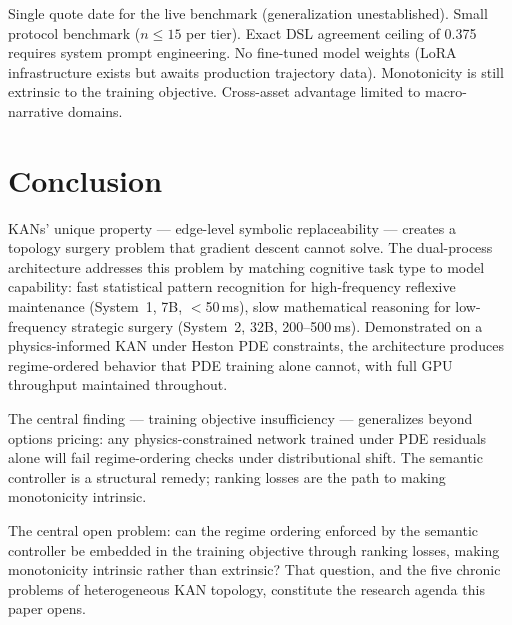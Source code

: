 \documentclass[11pt,a4paper]{article}
\begin{document}
Single quote date for the live benchmark (generalization unestablished). Small protocol
benchmark ($n \leq 15$ per tier). Exact DSL agreement ceiling of 0.375 requires system
prompt engineering. No fine-tuned model weights (LoRA infrastructure exists but
awaits production trajectory data). Monotonicity is still extrinsic to the training
objective. Cross-asset advantage limited to macro-narrative domains.

\section{Conclusion}
\label{sec:conclusion}

KANs' unique property --- edge-level symbolic replaceability --- creates a topology
surgery problem that gradient descent cannot solve. The dual-process architecture
addresses this problem by matching cognitive task type to model capability: fast
statistical pattern recognition for high-frequency reflexive maintenance (System~1,
7B, $<$50\,ms), slow mathematical reasoning for low-frequency strategic surgery
(System~2, 32B, 200--500\,ms). Demonstrated on a physics-informed KAN under Heston
PDE constraints, the architecture produces regime-ordered behavior that PDE training
alone cannot, with full GPU throughput maintained throughout.

The central finding --- training objective insufficiency --- generalizes beyond options
pricing: any physics-constrained network trained under PDE residuals alone will fail
regime-ordering checks under distributional shift. The semantic controller is a
structural remedy; ranking losses are the path to making monotonicity intrinsic.

The central open problem: can the regime ordering enforced by the semantic controller
be embedded in the training objective through ranking losses, making monotonicity
intrinsic rather than extrinsic? That question, and the five chronic problems of
heterogeneous KAN topology, constitute the research agenda this paper opens.



\end{document}
